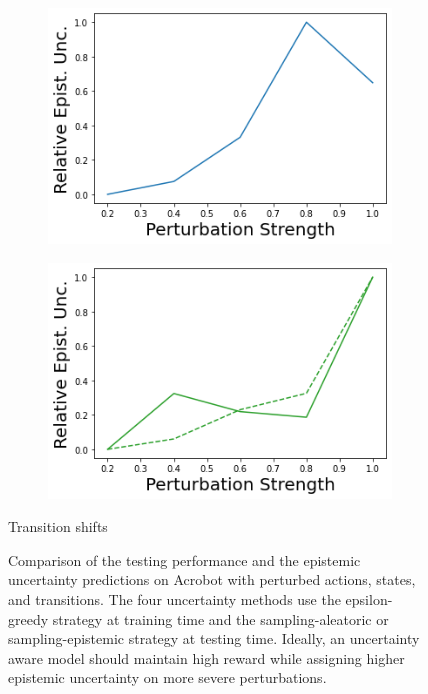 \begin{figure}
\begin{subfigure}{.24\textwidth}
        \includegraphics[width=\textwidth]{sections/011_icml2022/resources/transition_shift-DKL-AcrobotShift-v0-mean_epistemic_uncertainty_.png}
    \end{subfigure}
    \begin{subfigure}{.24\textwidth}
        \includegraphics[width=\textwidth]{sections/011_icml2022/resources/transition_shift-PostNet-AcrobotShift-v0-mean_epistemic_uncertainty_.png}
    \end{subfigure}
    \vspace{-3mm}
    \caption*{Transition shifts}
    \vspace{2mm}

    \caption{Comparison of the testing performance and the epistemic uncertainty predictions on Acrobot with perturbed actions, states, and transitions. The four uncertainty methods use the epsilon-greedy strategy at training time and the sampling-aleatoric or sampling-epistemic strategy at testing time. Ideally, an uncertainty aware model should maintain high reward while assigning higher epistemic uncertainty on more severe perturbations.}
    \label{fig:strategy-shift-testing-performance-acrobot}
        \vspace{-3mm}
\end{figure}